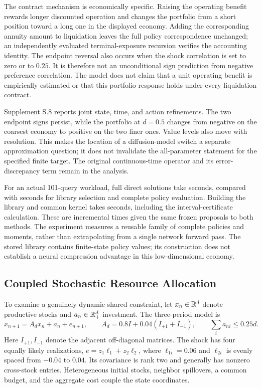 The contract mechanism is economically specific. Raising the operating benefit rewards longer discounted operation and changes the portfolio from a short position toward a long one in the displayed economy. Adding the corresponding annuity amount to liquidation leaves the full policy correspondence unchanged; an independently evaluated terminal-exposure recursion verifies the accounting identity. The endpoint reversal also occurs when the shock correlation is set to zero or to $0.25$. It is therefore not an unconditional sign prediction from negative preference correlation. The model does not claim that a unit operating benefit is empirically estimated or that this portfolio response holds under every liquidation contract.

Supplement S.8 reports joint state, time, and action refinements. The two endpoint signs persist, while the portfolio at $d=0.5$ changes from negative on the coarsest economy to positive on the two finer ones. Value levels also move with resolution. This makes the location of a diffusion-model switch a separate approximation question; it does not invalidate the all-parameter statement for the specified finite target. The original continuous-time operator and its error-discrepancy term remain in the analysis.

For an actual 101-query workload, full direct solutions take \NBOContractDirect{} seconds, compared with \NBOContractReuse{} seconds for library selection and complete policy evaluation. Building the library and common kernel takes \NBOContractPreparation{} seconds, including the interval-certificate calculation. These are incremental times given the same frozen proposals to both methods. The experiment measures a reusable family of complete policies and moments, rather than extrapolating from a single network forward pass. The stored library contains finite-state policy values; its construction does not establish a neural compression advantage in this low-dimensional economy.

\subsection{Coupled Stochastic Resource Allocation}
\label{sec:resource}
To examine a genuinely dynamic shared constraint, let $x_n\in\mathbb R^d$ denote productive stocks and $a_n\in\mathbb R_+^d$ investment. The three-period model is
\begin{equation}
 x_{n+1}=A_dx_n+a_n+e_{n+1},\qquad
 A_d=0.8I+0.04(I_{+1}+I_{-1}),\qquad
 \sum_i a_{ni}\leq0.25d.
 \label{eq:resource_state}
\end{equation}
Here $I_{+1},I_{-1}$ denote the adjacent off-diagonal matrices. The shock has four equally likely realizations,
$e=z_1\ell_1+z_2\ell_2$, where $\ell_{1i}=0.06$ and $\ell_{2i}$ is evenly spaced from $-0.04$ to $0.04$. Its covariance is rank two and generally has nonzero cross-stock entries. Heterogeneous initial stocks, neighbor spillovers, a common budget, and the aggregate cost couple the state coordinates.

